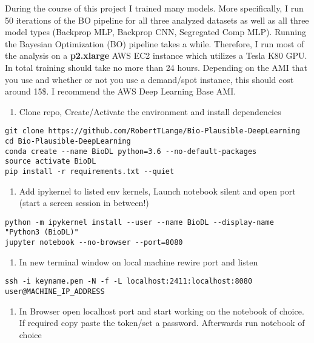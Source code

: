 During the course of this project I trained many models. More
specifically, I run 50 iterations of the BO pipeline for all three
analyzed datasets as well as all three model types (Backprop MLP,
Backprop CNN, Segregated Comp MLP). Running the Bayesian Optimization
(BO) pipeline takes a while. Therefore, I run most of the analysis on a
\textbf{p2.xlarge} AWS EC2 instance which utilizes a Tesla K80 GPU. In
total training should take no more than 24 hours. Depending on the AMI
that you use and whether or not you use a demand/spot instance, this
should cost around 15\$. I recommend the AWS Deep Learning Base AMI.

\begin{enumerate}
\def\labelenumi{\arabic{enumi}.}
\tightlist
\item
  Clone repo, Create/Activate the environment and install dependencies
\end{enumerate}

\begin{verbatim}
git clone https://github.com/RobertTLange/Bio-Plausible-DeepLearning
cd Bio-Plausible-DeepLearning
conda create --name BioDL python=3.6 --no-default-packages
source activate BioDL
pip install -r requirements.txt --quiet
\end{verbatim}

\begin{enumerate}
\def\labelenumi{\arabic{enumi}.}
\setcounter{enumi}{1}
\tightlist
\item
  Add ipykernel to listed env kernels, Launch notebook silent and open
  port (start a screen session in between!)
\end{enumerate}

\begin{verbatim}
python -m ipykernel install --user --name BioDL --display-name "Python3 (BioDL)"
jupyter notebook --no-browser --port=8080
\end{verbatim}

\begin{enumerate}
\def\labelenumi{\arabic{enumi}.}
\setcounter{enumi}{2}
\tightlist
\item
  In new terminal window on local machine rewire port and listen
\end{enumerate}

\begin{verbatim}
ssh -i keyname.pem -N -f -L localhost:2411:localhost:8080 user@MACHINE_IP_ADDRESS
\end{verbatim}

\begin{enumerate}
\def\labelenumi{\arabic{enumi}.}
\setcounter{enumi}{3}
\tightlist
\item
  In Browser open localhost port and start working on the notebook of
  choice. If required copy paste the token/set a password. Afterwards
  run notebook of choice
\end{enumerate}

